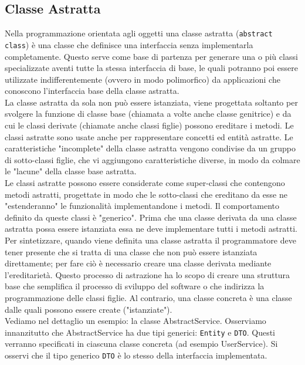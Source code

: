 \documentclass[a4paper,12 pt]{article}
\begin{document}
	\subsection{Classe Astratta}
	Nella programmazione orientata agli oggetti una classe astratta (\texttt{abstract class}) è una classe che definisce una interfaccia senza implementarla completamente. Questo serve come base di partenza per generare una o più classi specializzate aventi tutte la stessa interfaccia di base, le quali potranno poi essere utilizzate indifferentemente (ovvero in modo polimorfico) da applicazioni che conoscono l'interfaccia base della classe astratta.\\
	
	La classe astratta da sola non può essere istanziata, viene progettata soltanto per svolgere la funzione di classe base (chiamata a volte anche classe genitrice) e da cui le classi derivate (chiamate anche classi figlie) possono ereditare i metodi. Le classi astratte sono usate anche per rappresentare concetti ed entità astratte. Le caratteristiche "incomplete" della classe astratta vengono condivise da un gruppo di sotto-classi figlie, che vi aggiungono caratteristiche diverse, in modo da colmare le "lacune" della classe base astratta.\\
	
	Le classi astratte possono essere considerate come super-classi che contengono metodi astratti, progettate in modo che le sotto-classi che ereditano da esse ne "estenderanno" le funzionalità implementandone i metodi. Il comportamento definito da queste classi è "generico". Prima che una classe derivata da una classe astratta possa essere istanziata essa ne deve implementare tutti i metodi astratti.
	Per sintetizzare, quando viene definita una classe astratta il programmatore deve tener presente che si tratta di una classe che non può essere istanziata direttamente; per fare ciò è necessario creare una classe derivata mediante l'ereditarietà. Questo processo di astrazione ha lo scopo di creare una struttura base che semplifica il processo di sviluppo del software o che indirizza la programmazione delle classi figlie.
	Al contrario, una classe concreta è una classe dalle quali possono essere create ("istanziate").\\
	
	Vediamo nel dettaglio un esempio: la classe AbstractService. Osserviamo innanzitutto che AbstractService ha due tipi generici: \texttt{Entity} e \texttt{DTO}. Questi verranno specificati in ciascuna classe concreta (ad esempio UserService). Si osservi che il tipo generico \texttt{DTO} è lo stesso della interfaccia implementata.
	
\end{document}
